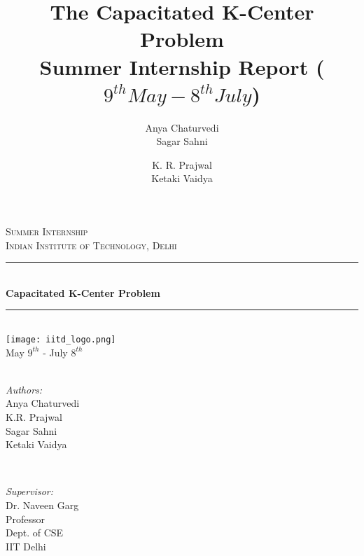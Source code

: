 \documentclass[12pt,a4paper,onecolumn]{article}
\author{Anya Chaturvedi \\ Sagar Sahni \and K. R. Prajwal \\ Ketaki Vaidya  }
\title{%
  The Capacitated K-Center Problem\\
  \large Summer Internship Report 
  ($9^{th} May-8^{th} July$)}
\date{}
\begin{document}
\begin{titlepage}

\newcommand{\HRule}{\rule{\linewidth}{0.5mm}} 

\center 

\textsc{\Large Summer Internship}\\[0.5cm] %
\textsc{\large Indian Institute of Technology, Delhi}\\[0.5cm] %



\HRule \\[0.4cm]
{ \huge \bfseries Capacitated K-Center Problem}\\[0.4cm] %
\HRule \\[1.5cm]
 

\texttt{[image: iitd\_logo.png]}\\[1cm] %



{\large May $9^{th}$ - July $8^{th}$}\\[9cm] %



 \begin{minipage}{0.4\textwidth}
\begin{flushleft} \large
\emph{\\Authors:}\\
Anya Chaturvedi\\
K.R. Prajwal\\
Sagar Sahni\\
Ketaki Vaidya
\end{flushleft}
\end{minipage}
~
\begin{minipage}{0.4\textwidth}
\begin{flushright} \large
\emph{Supervisor:} \\
Dr. Naveen Garg \\
Professor\\
Dept. of CSE\\
IIT Delhi %
\end{flushright}
\end{minipage}\\[2cm]

\vfill %

\end{titlepage}
\end{document}
